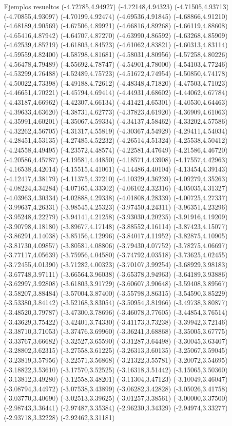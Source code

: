 \documentclass[11pt,a4paper]{article}
\begin{document}
\begin{fmex}{Ejemplos resueltos}
(-4.72785,4.94927) (-4.72148,4.94323) (-4.71505,4.93713) (-4.70855,4.93097) (-4.70199,4.92474) (-4.69536,4.91845) (-4.68866,4.91210) (-4.68189,4.90569) (-4.67506,4.89921) (-4.66816,4.89268) (-4.66119,4.88608) (-4.65416,4.87942) (-4.64707,4.87270) (-4.63990,4.86592) (-4.63268,4.85909) (-4.62539,4.85219) (-4.61803,4.84523) (-4.61062,4.83821) (-4.60313,4.83114) (-4.59559,4.82400) (-4.58798,4.81681) (-4.58031,4.80956) (-4.57258,4.80226) (-4.56478,4.79489) (-4.55692,4.78747) (-4.54901,4.78000) (-4.54103,4.77246) (-4.53299,4.76488) (-4.52489,4.75723) (-4.51672,4.74954) (-4.50850,4.74178) (-4.50022,4.73398) (-4.49188,4.72612) (-4.48348,4.71820) (-4.47503,4.71023) (-4.46651,4.70221) (-4.45794,4.69414) (-4.44931,4.68602) (-4.44062,4.67784) (-4.43187,4.66962) (-4.42307,4.66134) (-4.41421,4.65301) (-4.40530,4.64463) (-4.39633,4.63620) (-4.38731,4.62773) (-4.37823,4.61920) (-4.36909,4.61063) (-4.35991,4.60201) (-4.35067,4.59334) (-4.34137,4.58462) (-4.33202,4.57586) (-4.32262,4.56705) (-4.31317,4.55819) (-4.30367,4.54929) (-4.29411,4.54034) (-4.28451,4.53135) (-4.27485,4.52232) (-4.26514,4.51324) (-4.25538,4.50412) (-4.24558,4.49495) (-4.23572,4.48574) (-4.22581,4.47649) (-4.21586,4.46720) (-4.20586,4.45787) (-4.19581,4.44850) (-4.18571,4.43908) (-4.17557,4.42963) (-4.16538,4.42014) (-4.15515,4.41061) (-4.14486,4.40104) (-4.13454,4.39143) (-4.12417,4.38179) (-4.11375,4.37210) (-4.10329,4.36239) (-4.09279,4.35263) (-4.08224,4.34284) (-4.07165,4.33302) (-4.06102,4.32316) (-4.05035,4.31327) (-4.03963,4.30334) (-4.02888,4.29338) (-4.01808,4.28339) (-4.00725,4.27337) (-3.99637,4.26331) (-3.98545,4.25323) (-3.97450,4.24311) (-3.96351,4.23296) (-3.95248,4.22279) (-3.94141,4.21258) (-3.93030,4.20235) (-3.91916,4.19209) (-3.90798,4.18180) (-3.89677,4.17148) (-3.88552,4.16114) (-3.87423,4.15077) (-3.86291,4.14038) (-3.85156,4.12996) (-3.84017,4.11952) (-3.82875,4.10905) (-3.81730,4.09857) (-3.80581,4.08806) (-3.79430,4.07752) (-3.78275,4.06697) (-3.77117,4.05639) (-3.75956,4.04580) (-3.74792,4.03518) (-3.73625,4.02455) (-3.72455,4.01390) (-3.71282,4.00323) (-3.70107,3.99254) (-3.68929,3.98183) (-3.67748,3.97111) (-3.66564,3.96038) (-3.65378,3.94963) (-3.64189,3.93886) (-3.62997,3.92808) (-3.61803,3.91729) (-3.60607,3.90648) (-3.59408,3.89567) (-3.58207,3.88484) (-3.57004,3.87400) (-3.55798,3.86315) (-3.54590,3.85229) (-3.53380,3.84142) (-3.52168,3.83054) (-3.50954,3.81966) (-3.49738,3.80877) (-3.48520,3.79787) (-3.47300,3.78696) (-3.46078,3.77605) (-3.44854,3.76514) (-3.43629,3.75422) (-3.42401,3.74330) (-3.41173,3.73238) (-3.39942,3.72146) (-3.38710,3.71053) (-3.37476,3.69960) (-3.36241,3.68868) (-3.35005,3.67775) (-3.33767,3.66682) (-3.32527,3.65590) (-3.31287,3.64498) (-3.30045,3.63407) (-3.28802,3.62315) (-3.27558,3.61225) (-3.26313,3.60135) (-3.25067,3.59045) (-3.23819,3.57956) (-3.22571,3.56868) (-3.21322,3.55781) (-3.20072,3.54695) (-3.18822,3.53610) (-3.17570,3.52525) (-3.16318,3.51442) (-3.15065,3.50360) (-3.13812,3.49280) (-3.12558,3.48201) (-3.11304,3.47123) (-3.10049,3.46047) (-3.08794,3.44972) (-3.07538,3.43899) (-3.06282,3.42828) (-3.05026,3.41758) (-3.03770,3.40690) (-3.02513,3.39625) (-3.01257,3.38561) (-3.00000,3.37500) (-2.98743,3.36441) (-2.97487,3.35384) (-2.96230,3.34329) (-2.94974,3.33277) (-2.93718,3.32228) (-2.92462,3.31181) 
\end{fmex}
\end{document}
